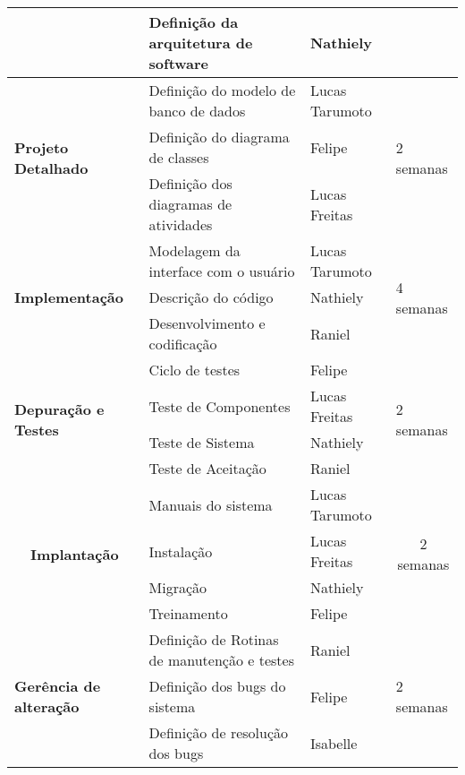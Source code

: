\begin{longtable}[c]{|p{11.28em}|p{16.055em}|p{6.665em}|p{6.22em}|}
\cmidrule{2-3}    \multicolumn{1}{|c|}{} & Definição da arquitetura de software & Nathiely & \multicolumn{1}{c|}{} \\
    \midrule
    \multirow{3}[6]{*}{\textbf{Projeto Detalhado}} & Definição do modelo de banco de dados & Lucas Tarumoto & \multirow{3}[6]{*}{2 semanas} \\
\cmidrule{2-3}    \multicolumn{1}{|c|}{} & Definição do diagrama de classes & Felipe & \multicolumn{1}{c|}{} \\
\cmidrule{2-3}    \multicolumn{1}{|c|}{} & Definição dos diagramas de atividades & Lucas Freitas & \multicolumn{1}{c|}{} \\
    \midrule
    \multirow{3}[6]{*}{\textbf{Implementação}} & Modelagem da interface com o usuário & Lucas Tarumoto & \multirow{3}[6]{*}{4 semanas} \\
\cmidrule{2-3}    \multicolumn{1}{|c|}{} & Descrição do código & Nathiely & \multicolumn{1}{c|}{} \\
\cmidrule{2-3}    \multicolumn{1}{|c|}{} & Desenvolvimento e codificação & Raniel & \multicolumn{1}{c|}{} \\
    \midrule
    \multirow{4}[8]{*}{\textbf{Depuração e Testes}} & Ciclo de testes & Felipe & \multirow{4}[8]{*}{2 semanas} \\
\cmidrule{2-3}    \multicolumn{1}{|c|}{} & Teste de Componentes & Lucas Freitas & \multicolumn{1}{c|}{} \\
\cmidrule{2-3}    \multicolumn{1}{|c|}{} & Teste de Sistema & Nathiely & \multicolumn{1}{c|}{} \\
\cmidrule{2-3}    \multicolumn{1}{|c|}{} & Teste de Aceitação & Raniel & \multicolumn{1}{c|}{} \\
    \midrule
    \multicolumn{1}{|c|}{\multirow{4}[8]{*}{\textbf{Implantação}}} & Manuais do sistema & Lucas Tarumoto & \multicolumn{1}{c|}{\multirow{4}[8]{*}{2 semanas}} \\
\cmidrule{2-3}          & Instalação & Lucas Freitas &  \\
\cmidrule{2-3}          & Migração & Nathiely &  \\
\cmidrule{2-3}          & Treinamento & Felipe &  \\
\midrule
    \multirow{3}[6]{*}{\textbf{Gerência de alteração}} & Definição de Rotinas de manutenção e testes & Raniel & \multirow{3}[6]{*}{2 semanas} \\
\cmidrule{2-3}    \multicolumn{1}{|c|}{} & Definição dos bugs do sistema & Felipe & \multicolumn{1}{c|}{} \\
\cmidrule{2-3}    \multicolumn{1}{|c|}{} & Definição de resolução dos bugs & Isabelle & \multicolumn{1}{c|}{} \\

\end{longtable}
